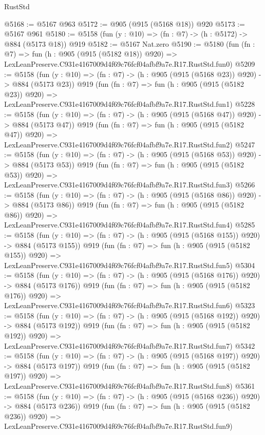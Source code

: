 \begin{lexlean}{RustStd}
\begin{coremodule}
@5168 := @5167 @963
@5172 := @905 (@915 (@5168 @18)) @920
@5173 := @5167 @961
@5180 := @5158 (fun (y : @10) => (fn : @7) -> (h : @5172) -> @884 (@5173 @18)) @919
@5182 := @5167 Nat.zero
@5190 := @5180
    (fun (fn : @7) =>
    fun (h : @905 (@915 (@5182 @18)) @920) =>
    LexLeanPreserve.C931e4167009d4f69c76fcf04afbf9a7e.R17.RustStd.fun0)
@5209 := @5158
    (fun (y : @10) => (fn : @7) -> (h : @905 (@915 (@5168 @23)) @920) -> @884 (@5173 @23))
    @919
    (fun (fn : @7) =>
    fun (h : @905 (@915 (@5182 @23)) @920) =>
    LexLeanPreserve.C931e4167009d4f69c76fcf04afbf9a7e.R17.RustStd.fun1)
@5228 := @5158
    (fun (y : @10) => (fn : @7) -> (h : @905 (@915 (@5168 @47)) @920) -> @884 (@5173 @47))
    @919
    (fun (fn : @7) =>
    fun (h : @905 (@915 (@5182 @47)) @920) =>
    LexLeanPreserve.C931e4167009d4f69c76fcf04afbf9a7e.R17.RustStd.fun2)
@5247 := @5158
    (fun (y : @10) => (fn : @7) -> (h : @905 (@915 (@5168 @53)) @920) -> @884 (@5173 @53))
    @919
    (fun (fn : @7) =>
    fun (h : @905 (@915 (@5182 @53)) @920) =>
    LexLeanPreserve.C931e4167009d4f69c76fcf04afbf9a7e.R17.RustStd.fun3)
@5266 := @5158
    (fun (y : @10) => (fn : @7) -> (h : @905 (@915 (@5168 @86)) @920) -> @884 (@5173 @86))
    @919
    (fun (fn : @7) =>
    fun (h : @905 (@915 (@5182 @86)) @920) =>
    LexLeanPreserve.C931e4167009d4f69c76fcf04afbf9a7e.R17.RustStd.fun4)
@5285 := @5158
    (fun (y : @10) => (fn : @7) -> (h : @905 (@915 (@5168 @155)) @920) -> @884 (@5173 @155))
    @919
    (fun (fn : @7) =>
    fun (h : @905 (@915 (@5182 @155)) @920) =>
    LexLeanPreserve.C931e4167009d4f69c76fcf04afbf9a7e.R17.RustStd.fun5)
@5304 := @5158
    (fun (y : @10) => (fn : @7) -> (h : @905 (@915 (@5168 @176)) @920) -> @884 (@5173 @176))
    @919
    (fun (fn : @7) =>
    fun (h : @905 (@915 (@5182 @176)) @920) =>
    LexLeanPreserve.C931e4167009d4f69c76fcf04afbf9a7e.R17.RustStd.fun6)
@5323 := @5158
    (fun (y : @10) => (fn : @7) -> (h : @905 (@915 (@5168 @192)) @920) -> @884 (@5173 @192))
    @919
    (fun (fn : @7) =>
    fun (h : @905 (@915 (@5182 @192)) @920) =>
    LexLeanPreserve.C931e4167009d4f69c76fcf04afbf9a7e.R17.RustStd.fun7)
@5342 := @5158
    (fun (y : @10) => (fn : @7) -> (h : @905 (@915 (@5168 @197)) @920) -> @884 (@5173 @197))
    @919
    (fun (fn : @7) =>
    fun (h : @905 (@915 (@5182 @197)) @920) =>
    LexLeanPreserve.C931e4167009d4f69c76fcf04afbf9a7e.R17.RustStd.fun8)
@5361 := @5158
    (fun (y : @10) => (fn : @7) -> (h : @905 (@915 (@5168 @236)) @920) -> @884 (@5173 @236))
    @919
    (fun (fn : @7) =>
    fun (h : @905 (@915 (@5182 @236)) @920) =>
    LexLeanPreserve.C931e4167009d4f69c76fcf04afbf9a7e.R17.RustStd.fun9)

\end{coremodule}
\end{lexlean}
